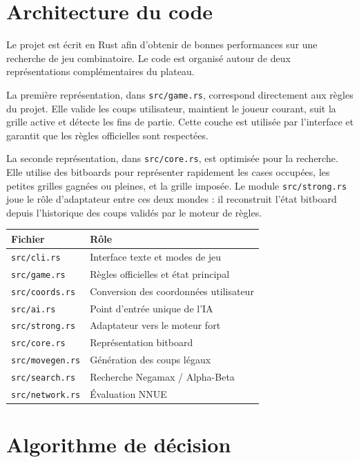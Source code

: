 \documentclass{pssbmac}
\begin{document}
\section{Architecture du code}

Le projet est écrit en Rust afin d'obtenir de bonnes performances sur une recherche de jeu combinatoire. Le code est organisé autour de deux représentations complémentaires du plateau.

La première représentation, dans \texttt{src/game.rs}, correspond directement aux règles du projet. Elle valide les coups utilisateur, maintient le joueur courant, suit la grille active et détecte les fins de partie. Cette couche est utilisée par l'interface et garantit que les règles officielles sont respectées.

La seconde représentation, dans \texttt{src/core.rs}, est optimisée pour la recherche. Elle utilise des bitboards pour représenter rapidement les cases occupées, les petites grilles gagnées ou pleines, et la grille imposée. Le module \texttt{src/strong.rs} joue le rôle d'adaptateur entre ces deux mondes : il reconstruit l'état bitboard depuis l'historique des coups validés par le moteur de règles.

\begin{center}
\begin{tabular}{ll}
\hline
\rowcolor{TableHeader}
\textbf{Fichier} & \textbf{Rôle} \\
\hline
\texttt{src/cli.rs} & Interface texte et modes de jeu \\
\texttt{src/game.rs} & Règles officielles et état principal \\
\texttt{src/coords.rs} & Conversion des coordonnées utilisateur \\
\texttt{src/ai.rs} & Point d'entrée unique de l'IA \\
\texttt{src/strong.rs} & Adaptateur vers le moteur fort \\
\texttt{src/core.rs} & Représentation bitboard \\
\texttt{src/movegen.rs} & Génération des coups légaux \\
\texttt{src/search.rs} & Recherche Negamax / Alpha-Beta \\
\texttt{src/network.rs} & Évaluation NNUE \\
\hline
\end{tabular}
\end{center}

\section{Algorithme de décision}
\end{document}
